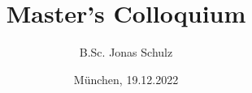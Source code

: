 %
% 
% 
%




\usepackage{tikz}
\usepackage{amsmath}
\usepackage{relsize}
\usepackage{amssymb}
\usepackage{mathtools}
\usepackage{algorithm}
\usepackage{algpseudocode}
\usepackage{subfigure}
\usetikzlibrary{shapes.geometric, arrows, backgrounds, calc, positioning, decorations.pathreplacing, calligraphy}

\renewcommand{\PersonTitel}{B.Sc.}
\renewcommand{\PersonVorname}{Jonas}
\renewcommand{\PersonNachname}{Schulz}
\renewcommand{\LehrstuhlName}{@ Chair of Algorithms and Complexity}
\newcommand{\Datum}{19.12.2022}

\renewcommand{\PraesentationFusszeileZusatz}{| Master's Colloquium | An Experimental Evaluation of Heuristics for Approx. Maxflow Alg.}

\title{Master's Colloquium}
\author{\PersonTitel{} \PersonVorname{} \PersonNachname}
\institute[]{\UniversitaetName \\ \FakultaetName}
\date[\Datum]{München, 19.12.2022}
\subject{An Experimental Evaluation of Heuristics for Approximate Maxflow Algorithms}


